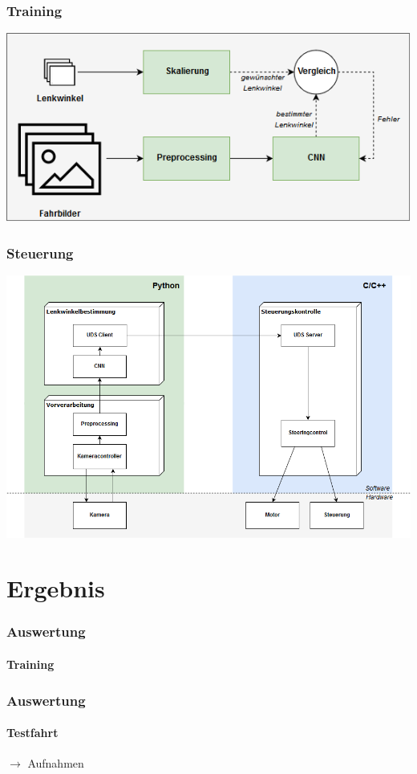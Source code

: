 \documentclass{beamer}
\begin{document}
\begin{frame}
\frametitle{Training}
\includegraphics[width=\linewidth]{figures/Lernarchitektur.png}	 
\end{frame}

\begin{frame}
\frametitle{Steuerung}
\includegraphics[width=\linewidth]{figures/Steuerung.png}	 

\end{frame}


\section{Ergebnis}
\frame{\tableofcontents[currentsection]}

\begin{frame}
\frametitle{Auswertung}
\framesubtitle{Training}

\end{frame}


\begin{frame}
\frametitle{Auswertung}
\framesubtitle{Testfahrt}

\centering
{\huge $\xrightarrow{}$} {\huge Aufnahmen} 

\end{frame}
\end{document}
